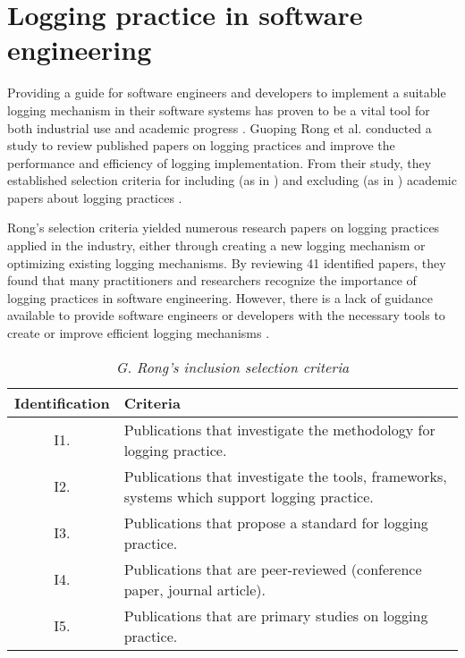 \cleardoublepage
\appendix

\chapter{Logging practice in software engineering}\label{apx:loggingPractice}
Providing a guide for software engineers and developers to implement a suitable logging mechanism in their software systems has proven to be a vital tool for both industrial use and academic progress \cite{Rong2018a}. Guoping Rong et al. conducted a study to review published papers on logging practices and improve the performance and efficiency of logging implementation. From their study, they established selection criteria for including (as in ) and excluding (as in ) academic papers about logging practices \cite{Rong2018a,Rong2018}.\par Rong's selection criteria yielded numerous research papers on logging practices applied in the industry, either through creating a new logging mechanism or optimizing existing logging mechanisms. By reviewing 41 identified papers, they found that many practitioners and researchers recognize the importance of logging practices in software engineering. However, there is a lack of guidance available to provide software engineers or developers with the necessary tools to create or improve efficient logging mechanisms \cite{Rong2018a,Zhu2015}.

\begin{table}[!htb]
	\centering
	\caption[G. Rong's inclusion selection criteria]
	{\textit{G. Rong's inclusion selection criteria \cite{Rong2018a}}}
	\label{tbl:CH1_RongIncSelectionCriteria}
	\begin{tabularx}{\textwidth}{|c|X|}
		\hline \textbf{Identification} & \textbf{Criteria} \\
		\hline I1. & Publications that investigate the methodology for logging practice. \\
		\hline I2. & Publications that investigate the tools, frameworks, systems which support logging practice. \\
		\hline I3. & Publications that propose a standard for logging practice.\\
		\hline I4. & Publications that are peer-reviewed (conference paper, journal article). \\
		\hline I5. & Publications that are primary studies on logging practice. \\
		\hline
	\end{tabularx}
\end{table}

